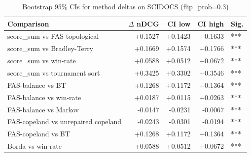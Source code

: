 \begin{table}[ht]
\centering
\caption{Bootstrap 95\% CIs for method deltas on SCIDOCS (flip\_prob=0.3)}
\label{tab:bootstrap_scidocs}
\begin{tabular}{lrrrl}
\toprule
Comparison & $\Delta$ nDCG & CI low & CI high & Sig. \\
\midrule
score\_sum vs FAS topological & +0.1527 & +0.1423 & +0.1633 & *** \\
score\_sum vs Bradley-Terry & +0.1669 & +0.1574 & +0.1766 & *** \\
score\_sum vs win-rate & +0.0588 & +0.0512 & +0.0672 & *** \\
score\_sum vs tournament sort & +0.3425 & +0.3302 & +0.3546 & *** \\
FAS-balance vs BT & +0.1268 & +0.1172 & +0.1364 & *** \\
FAS-balance vs win-rate & +0.0187 & +0.0115 & +0.0263 & *** \\
FAS-balance vs Markov & -0.0147 & -0.0231 & -0.0067 & *** \\
FAS-copeland vs unrepaired copeland & -0.0243 & -0.0301 & -0.0194 & *** \\
FAS-copeland vs BT & +0.1268 & +0.1172 & +0.1364 & *** \\
Borda vs win-rate & +0.0588 & +0.0512 & +0.0672 & *** \\
\bottomrule
\end{tabular}
\end{table}